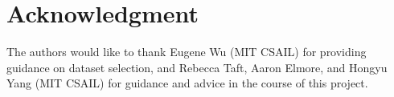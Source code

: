 \section*{Acknowledgment}
The authors would like to thank Eugene Wu (MIT CSAIL) for providing guidance on dataset selection, and Rebecca Taft, Aaron Elmore, and Hongyu Yang (MIT CSAIL) for guidance and advice in the course of this project.
